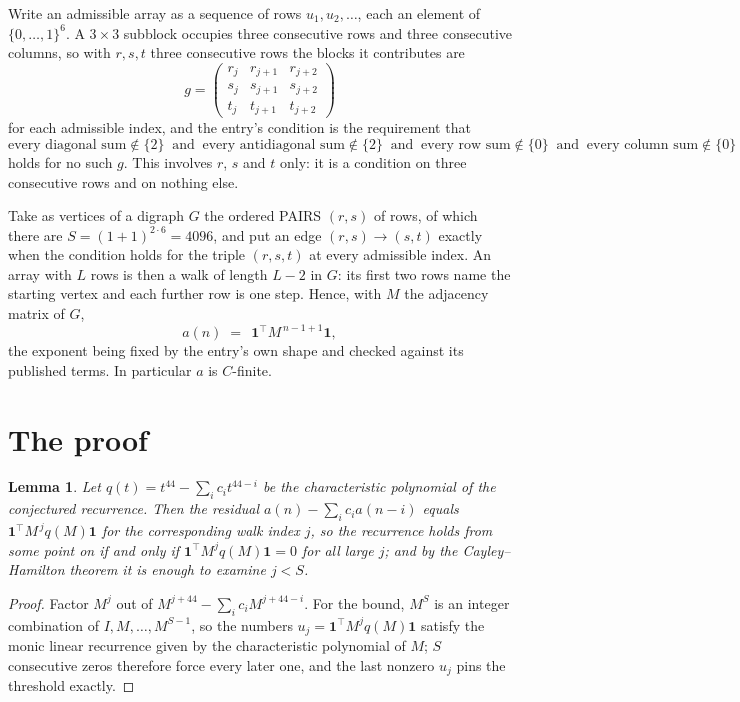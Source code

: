 \documentclass[11pt,a4paper]{article}
\theoremstyle{plain}
\newtheorem{lemma}[theorem]{Lemma}
\theoremstyle{definition}
\begin{document}
Write an admissible array as a sequence of rows $u_1,u_2,\dots$, each an element of
$\{0,\dots,1\}^{6}$. A $3\times3$ subblock occupies three consecutive rows and
three consecutive columns, so with $r,s,t$ three consecutive rows the blocks it
contributes are
\[
g=\begin{pmatrix}r_j&r_{j+1}&r_{j+2}\\ s_j&s_{j+1}&s_{j+2}\\ t_j&t_{j+1}&t_{j+2}\end{pmatrix}
\]
for each admissible index, and the entry's condition is the requirement that
\[
\text{every diagonal sum} \notin \{2\}\ \text{ and }\ \text{every antidiagonal sum} \notin \{2\}\ \text{ and }\ \text{every row sum} \notin \{0\}\ \text{ and }\ \text{every column sum} \notin \{0\}
\]
holds for no such $g$. This involves $r$, $s$ and $t$ only: it is a condition on
three consecutive rows and on nothing else.

Take as vertices of a digraph $G$ the ordered PAIRS $(r,s)$ of rows, of which there are
$S=(1+1)^{2\cdot6}=4096$, and put an edge $(r,s)\to(s,t)$ exactly when the condition
holds for the triple $(r,s,t)$ at every admissible index. An array with $L$ rows is then a
walk of length $L-2$ in $G$: its first two rows name the starting vertex and each further
row is one step. Hence, with $M$ the adjacency matrix of $G$,
\[
a(n)\;=\;\,\mathbf{1}^{\!\top}M^{\,n-1+1}\mathbf{1},
\]
the exponent being fixed by the entry's own shape and checked against its published terms.
In particular $a$ is $C$-finite.

\section{The proof}

\begin{lemma}\label{lem:crit}
Let $q(t)=t^{44}-\sum_i c_it^{44-i}$ be the characteristic polynomial of the
conjectured recurrence. Then the residual $a(n)-\sum_ic_ia(n-i)$ equals
$\mathbf{1}^{\!\top}M^{\,j}q(M)\mathbf{1}$ for the corresponding walk index
$j$, so the recurrence holds from some point on if and only if
$\mathbf{1}^{\!\top}M^{j}q(M)\mathbf{1}=0$ for all large $j$; and by the
Cayley--Hamilton theorem it is enough to examine $j<S$.
\end{lemma}

\begin{proof}
Factor $M^{j}$ out of $M^{j+44}-\sum_ic_iM^{j+44-i}$. For the bound, $M^{S}$
is an integer combination of $I,M,\dots,M^{S-1}$, so the numbers
$u_j=\mathbf{1}^{\!\top}M^{j}q(M)\mathbf{1}$ satisfy the monic linear recurrence given by
the characteristic polynomial of $M$; $S$ consecutive zeros therefore force every later one,
and the last nonzero $u_j$ pins the threshold exactly.
\end{proof}
\end{document}
